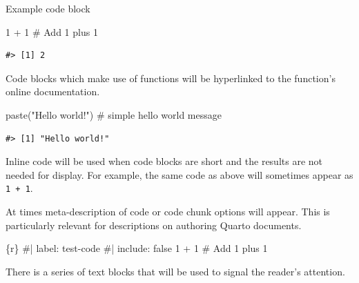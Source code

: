 \documentclass[
  letterpaper,
]{latex/krantz}
\newenvironment{Shaded}{\begin{snugshade}}{\end{snugshade}}
\newcommand{\CommentTok}[1]{\textcolor[rgb]{0.37,0.37,0.37}{#1}}
\newcommand{\DecValTok}[1]{\textcolor[rgb]{0.68,0.00,0.00}{#1}}
\newcommand{\FunctionTok}[1]{\textcolor[rgb]{0.28,0.35,0.67}{#1}}
\newcommand{\InformationTok}[1]{\textcolor[rgb]{0.37,0.37,0.37}{#1}}
\newcommand{\NormalTok}[1]{\textcolor[rgb]{0.00,0.23,0.31}{#1}}
\newcommand{\SpecialCharTok}[1]{\textcolor[rgb]{0.37,0.37,0.37}{#1}}
\newcommand{\StringTok}[1]{\textcolor[rgb]{0.13,0.47,0.30}{#1}}
\begin{document}
\begin{codelisting}

\caption{Example code block}

\hypertarget{lst-code-block}{%
\label{lst-code-block}}%
\begin{Shaded}
\begin{Highlighting}[]
\DecValTok{1} \SpecialCharTok{+} \DecValTok{1} \CommentTok{\# Add 1 plus 1}
\end{Highlighting}
\end{Shaded}

\end{codelisting}

\begin{verbatim}
#> [1] 2
\end{verbatim}

Code blocks which make use of functions will be hyperlinked to the
function's online documentation.

\begin{Shaded}
\begin{Highlighting}[]
\FunctionTok{paste}\NormalTok{(}\StringTok{"Hello world!"}\NormalTok{) }\CommentTok{\# simple \textquotesingle{}hello world\textquotesingle{} message}
\end{Highlighting}
\end{Shaded}

\begin{verbatim}
#> [1] "Hello world!"
\end{verbatim}

Inline code will be used when code blocks are short and the results are
not needed for display. For example, the same code as above will
sometimes appear as \texttt{1\ +\ 1}.

At times meta-description of code or code chunk options will appear.
This is particularly relevant for descriptions on authoring Quarto
documents.

\begin{Shaded}
\begin{Highlighting}[]
\InformationTok{\textasciigrave{}\textasciigrave{}\textasciigrave{}\{r\}}
\CommentTok{\#| label: test{-}code }
\CommentTok{\#| include: false}
\DecValTok{1} \SpecialCharTok{+} \DecValTok{1} \CommentTok{\# Add 1 plus 1}
\InformationTok{\textasciigrave{}\textasciigrave{}\textasciigrave{}}
\end{Highlighting}
\end{Shaded}

There is a series of text blocks that will be used to signal the
reader's attention.
\end{document}
